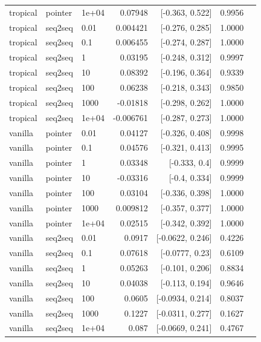 \documentclass[10pt]{article}
\begin{document}
{\begin{longtable}{lllrrrl}
tropical & pointer & 1e+04 & 0.07948 & [-0.363, 0.522] & 0.9956 & \\
tropical & seq2seq & 0.01 & 0.004421 & [-0.276, 0.285] & 1.0000 & \\
tropical & seq2seq & 0.1 & 0.006455 & [-0.274, 0.287] & 1.0000 & \\
tropical & seq2seq & 1 & 0.03195 & [-0.248, 0.312] & 0.9997 & \\
tropical & seq2seq & 10 & 0.08392 & [-0.196, 0.364] & 0.9339 & \\
tropical & seq2seq & 100 & 0.06238 & [-0.218, 0.343] & 0.9850 & \\
tropical & seq2seq & 1000 & -0.01818 & [-0.298, 0.262] & 1.0000 & \\
tropical & seq2seq & 1e+04 & -0.006761 & [-0.287, 0.273] & 1.0000 & \\
vanilla & pointer & 0.01 & 0.04127 & [-0.326, 0.408] & 0.9998 & \\
vanilla & pointer & 0.1 & 0.04576 & [-0.321, 0.413] & 0.9995 & \\
vanilla & pointer & 1 & 0.03348 & [-0.333, 0.4] & 0.9999 & \\
vanilla & pointer & 10 & -0.03316 & [-0.4, 0.334] & 0.9999 & \\
vanilla & pointer & 100 & 0.03104 & [-0.336, 0.398] & 1.0000 & \\
vanilla & pointer & 1000 & 0.009812 & [-0.357, 0.377] & 1.0000 & \\
vanilla & pointer & 1e+04 & 0.02515 & [-0.342, 0.392] & 1.0000 & \\
vanilla & seq2seq & 0.01 & 0.0917 & [-0.0622, 0.246] & 0.4226 & \\
vanilla & seq2seq & 0.1 & 0.07618 & [-0.0777, 0.23] & 0.6109 & \\
vanilla & seq2seq & 1 & 0.05263 & [-0.101, 0.206] & 0.8834 & \\
vanilla & seq2seq & 10 & 0.04038 & [-0.113, 0.194] & 0.9646 & \\
vanilla & seq2seq & 100 & 0.0605 & [-0.0934, 0.214] & 0.8037 & \\
vanilla & seq2seq & 1000 & 0.1227 & [-0.0311, 0.277] & 0.1627 & \\
vanilla & seq2seq & 1e+04 & 0.087 & [-0.0669, 0.241] & 0.4767 & \\
\bottomrule
\end{longtable}
}
\end{document}
